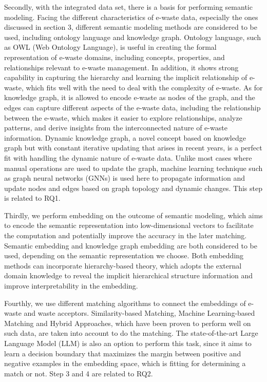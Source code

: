 \documentclass{article}
\numberwithin{equation}{section}
\begin{document}
Secondly, with the integrated data set, there is a basis for performing semantic modeling. Facing the different characteristics of e-waste data, especially the ones discussed in section 3, different semantic modeling methods are considered to be used, including ontology language and knowledge graph. Ontology language, such as OWL (Web Ontology Language), is useful in creating the formal representation of e-waste domains, including concepts, properties, and relationships relevant to e-waste management. In addition, it shows strong capability in capturing the hierarchy and learning the implicit relationship of e-waste, which fits well with the need to deal with the complexity of e-waste. As for knowledge graph, it is allowed to encode e-waste as nodes of the graph, and the edges can capture different aspects of the e-waste data, including the relationship between the e-waste, which makes it easier to explore relationships, analyze patterns, and derive insights from the interconnected nature of e-waste information. Dynamic knowledge graph\cite{far24}, a novel concept based on knowledge graph but with constant iterative updating that arises in recent years, is a perfect fit with handling the dynamic nature of e-waste data. Unlike most cases where manual operations are used to update the graph, machine learning technique such as graph neural networks (GNNs)\cite{scar09} is used here to propagate information and update nodes and edges based on graph topology and dynamic changes. This step is related to RQ1.

Thirdly, we perform embedding on the outcome of semantic modeling, which aims to encode the semantic representation into low-dimensional vectors to facilitate the computation and potentially improve the accuracy in the later matching. Semantic embedding\cite{mum22} and knowledge graph embedding\cite{myk22} are both considered to be used, depending on the semantic representation we choose. Both embedding methods can incorporate hierarchy-based theory\cite{lin22}, which adopts the external domain knowledge to reveal the implicit hierarchical structure information and improve interpretability in the embedding.

Fourthly, we use different matching algorithms to connect the embeddings of e-waste and waste acceptors. Similarity-based Matching, Machine Learning-based Matching and Hybrid Approaches, which have been proven to perform well on such data, are taken into account to do the matching. The state-of-the-art Large Language Model (LLM) is also an option to perform this task, since it aims to learn a decision boundary that maximizes the margin between positive and negative examples in the embedding space, which is fitting for determining a match or not. Step 3 and 4 are related to RQ2.
\end{document}
